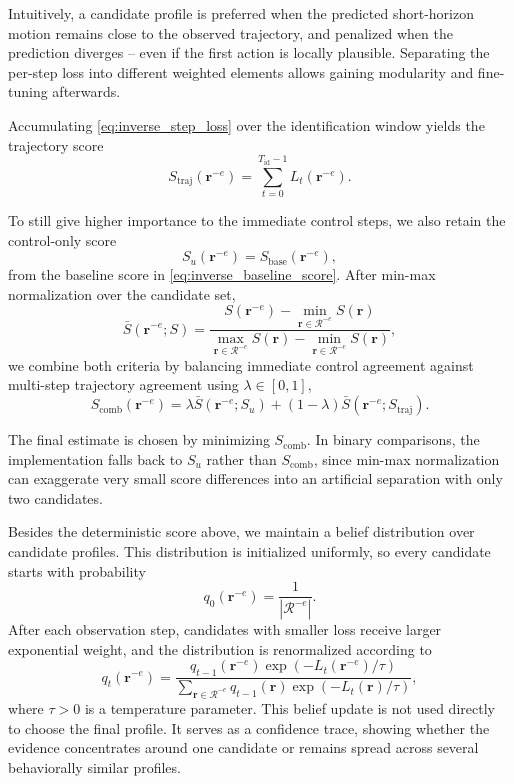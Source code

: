 Intuitively, a candidate profile is preferred when the predicted short-horizon
motion remains close to the observed trajectory, and penalized when the prediction diverges -- even if the
first action is locally plausible.
Separating the per-step loss into different
weighted elements allows gaining modularity and fine-tuning afterwards.

Accumulating \cref{eq:inverse_step_loss} over the identification window yields the trajectory score
\begin{equation*}
S_{\mathrm{traj}}(\boldsymbol{r}^{-e}) =
\sum_{t=0}^{T_{\mathrm{id}}-1} L_t(\boldsymbol{r}^{-e}).
\end{equation*}

To still give higher importance to the immediate control steps,
we also retain the control-only score
\[
S_u(\boldsymbol{r}^{-e}) = S_{\mathrm{base}}(\boldsymbol{r}^{-e}),
\]
from the baseline score in \cref{eq:inverse_baseline_score}.
After min-max normalization over the candidate set,
\begin{equation}
\bar{S}(\boldsymbol{r}^{-e}; S)
=
\frac{S(\boldsymbol{r}^{-e}) - \min_{\boldsymbol{r} \in \mathcal R^{-e}} S(\boldsymbol{r})}
{\max_{\boldsymbol{r} \in \mathcal R^{-e}} S(\boldsymbol{r}) - \min_{\boldsymbol{r} \in \mathcal R^{-e}} S(\boldsymbol{r})},
\label{eq:inverse_normalized_score}
\end{equation}
we combine both criteria by balancing immediate control agreement against multi-step
trajectory agreement using $\lambda \in [0,1]$,
\begin{equation}
S_{\mathrm{comb}}(\boldsymbol{r}^{-e})
=
\lambda \bar{S}(\boldsymbol{r}^{-e}; S_u)
+
(1-\lambda)\bar{S}(\boldsymbol{r}^{-e}; S_{\mathrm{traj}}).
\label{eq:inverse_combined_score}
\end{equation}

The final estimate is chosen by minimizing $S_{\mathrm{comb}}$.
In binary comparisons, the implementation falls back to $S_u$ rather than
$S_{\mathrm{comb}}$, since min-max normalization can
exaggerate very small score differences into an artificial separation with only two candidates.

Besides the deterministic score above, we maintain a belief distribution over candidate profiles.
This distribution is initialized uniformly, so every candidate starts with probability
\[
q_0(\boldsymbol{r}^{-e}) = \frac{1}{|\mathcal R^{-e}|}.
\]
After each observation step, candidates with smaller loss receive larger exponential weight, and the
distribution is renormalized according to
\begin{equation}
q_t(\boldsymbol{r}^{-e})
=
\frac{
q_{t-1}(\boldsymbol{r}^{-e}) \exp\!\left(-L_t(\boldsymbol{r}^{-e}) / \tau\right)
}{
\sum_{\boldsymbol{r} \in \mathcal R^{-e}}
q_{t-1}(\boldsymbol{r}) \exp\!\left(-L_t(\boldsymbol{r}) / \tau\right)
},
\label{eq:inverse_posterior}
\end{equation}
where $\tau > 0$ is a temperature parameter.
This belief update is not used directly to choose the final profile.
It serves as a confidence trace, showing whether the evidence concentrates around one candidate or
remains spread across several behaviorally similar profiles.

